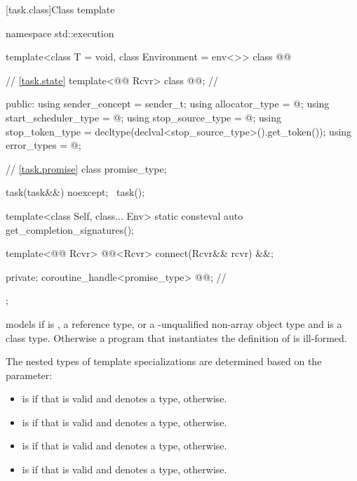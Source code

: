 [task.class]{Class template }

\begin{codeblock}
namespace std::execution {
  template<class T = void, class Environment = env<>>
  class @@ {
    // \ref{task.state}
    template<@@ Rcvr>
      class @@;                              // \expos

  public:
    using sender_concept = sender_t;
    using allocator_type = @\seebelow@;
    using start_scheduler_type = @\seebelow@;
    using stop_source_type = @\seebelow@;
    using stop_token_type = decltype(declval<stop_source_type>().get_token());
    using error_types = @\seebelow@;

    // \ref{task.promise}
    class promise_type;

    task(task&&) noexcept;
    ~task();

    template<class Self, class... Env>
      static consteval auto get_completion_signatures();

    template<@@ Rcvr>
      @@<Rcvr> connect(Rcvr&& rcvr) &&;

  private:
    coroutine_handle<promise_type> @@;      // \expos
  };
}
\end{codeblock}

\pnum
{} models 
if  is , a reference type, or a \cv{}-unqualified
non-array object type and  is a class type.
Otherwise a program that instantiates the definition of 
is ill-formed.

\pnum
The nested types of  template specializations
are determined based on the  parameter:
\begin{itemize}
\item {} is 
if that  is valid and denotes a type,
 otherwise.
\item {} is 
if that  is valid and denotes a type,
 otherwise.
\item {} is 
if that  is valid and denotes a type,
 otherwise.
\item {} is  if
that  is valid and denotes a type,
 otherwise.
\end{itemize}

